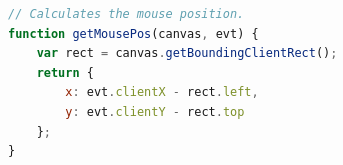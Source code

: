 \begin{lstlisting}[language=JavaScript,caption={Mausposition ermitteln.}]
// Calculates the mouse position.
function getMousePos(canvas, evt) {
	var rect = canvas.getBoundingClientRect();
	return {
		x: evt.clientX - rect.left,
		y: evt.clientY - rect.top
	};
}
\end{lstlisting}














